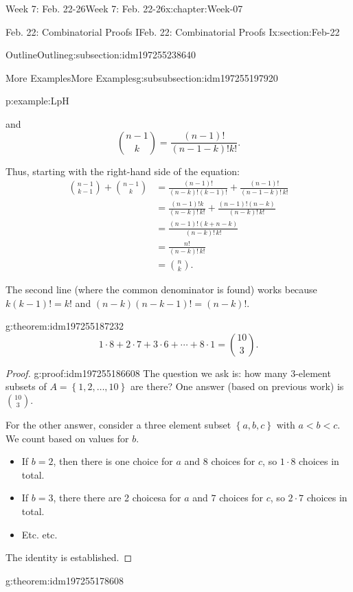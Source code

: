 \documentclass[oneside,10pt,]{book}
\numberwithin{equation}{section}
\newcommand{\set}[1]{\left\{ {#1} \right\}}
\newcommand{\lt}{<}
\newcommand{\amp}{&}
\begin{document}
\begin{chapterptx}{Week 7: Feb. 22-26}{}{Week 7: Feb. 22-26}{}{}{x:chapter:Week-07}
\begin{sectionptx}{Feb. 22: Combinatorial Proofs I}{}{Feb. 22: Combinatorial Proofs I}{}{}{x:section:Feb-22}
\begin{subsectionptx}{Outline}{}{Outline}{}{}{g:subsection:idm197255238640}
\begin{subsubsectionptx}{More Examples}{}{More Examples}{}{}{g:subsubsection:idm197255197920}
\begin{example}{}{p:example:LpH}
\begin{solutionproof}
\begin{equation*}
\end{equation*}
and%
\begin{equation*}
{n-1 \choose k} = \frac{(n-1)!}{(n-1-k)!k!}\text{.}
\end{equation*}
%
\par
Thus, starting with the right-hand side of the equation:%
\begin{align*}
{n-1 \choose k-1} + {n-1 \choose k} \amp = \frac{(n-1)!}{(n-k)!(k-1)!}+ \frac{(n-1)!}{(n-1-k)!\,k!}\\
\amp = \frac{(n-1)!k}{(n-k)!\,k!} + \frac{(n-1)!(n-k)}{(n-k)!\,k!}\\
\amp = \frac{(n-1)!(k+n-k)}{(n-k)!\,k!}\\
\amp = \frac{n!}{(n-k)!\, k!}\\
\amp = {n \choose k}\text{.}
\end{align*}
%
\par
The second line (where the common denominator is found) works because \(k(k-1)! = k!\) and \((n-k)(n-k-1)! = (n-k)!\).%
\end{solutionproof}
\end{example}
\begin{theorem}{}{}{g:theorem:idm197255187232}%
%
\begin{equation*}
1\cdot 8 + 2\cdot 7 + 3\cdot 6 + \cdots + 8\cdot 1 = \binom{10}{3}.
\end{equation*}
\end{theorem}
\begin{proof}{}{g:proof:idm197255186608}
The question we ask is: how many 3-element subsets of \(A= \set{1,2,\ldots, 10}\) are there? One answer (based on previous work) is \(\binom{10}{3}\).%
\par
For the other answer, consider a three element subset \(\set{a,b,c}\) with \(a \lt b \lt c\). We count based on values for \(b\).%
%
\begin{itemize}[label=\textbullet]
\item{}If \(b=2\), then there is one choice for \(a\) and 8 choices for \(c\), so \(1\cdot 8\) choices in total.%
\item{}If \(b=3\), there there are 2 choicesa for \(a\) and \(7\) choices for \(c\), so \(2\cdot 7\) choices in total.%
\item{}Etc. etc.%
\end{itemize}
The identity is established.%
\end{proof}
\begin{theorem}{}{}{g:theorem:idm197255178608}%
%
\begin{equation*}

\end{equation*}
\end{theorem}
\end{subsubsectionptx}
\end{subsectionptx}
\end{sectionptx}
\end{chapterptx}
\end{document}
